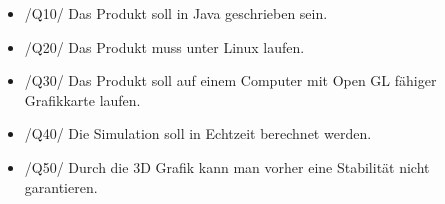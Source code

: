\begin{itemize}

\item  /Q10/ Das Produkt soll in Java geschrieben sein.
\item  /Q20/ Das Produkt muss unter Linux laufen.
\item  /Q30/ Das Produkt soll auf einem Computer mit Open GL fähiger Grafikkarte laufen.
\item  /Q40/ Die Simulation soll in Echtzeit berechnet werden.
\item  /Q50/ Durch die 3D Grafik kann man vorher eine Stabilität nicht garantieren.

\end{itemize}
